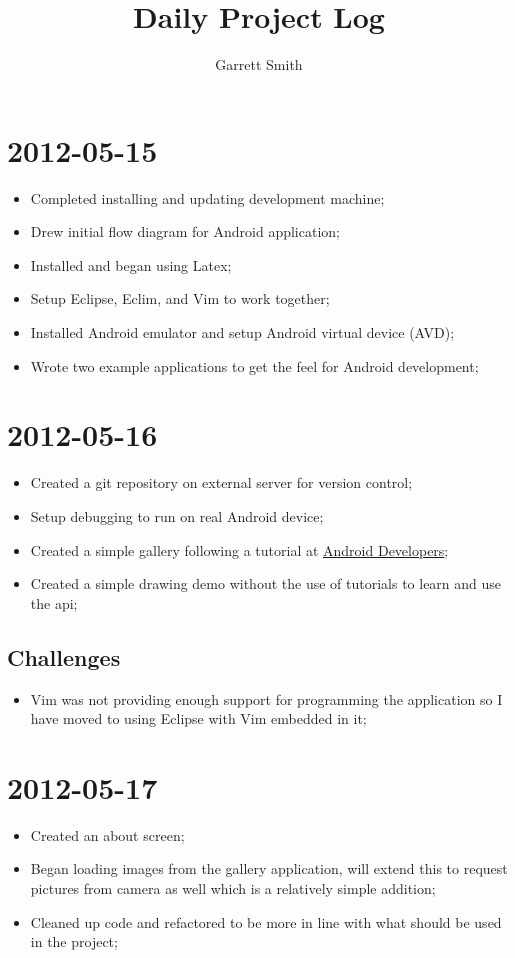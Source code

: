 \documentclass{report}
\title{Daily Project Log}
\author{Garrett Smith}
\begin{document}
\section*{2012-05-15}
\begin{itemize}
  \item
    Completed installing and updating development machine;
  \item
    Drew initial flow diagram for Android application;
  \item
    Installed and began using Latex;
  \item 
    Setup Eclipse, Eclim, and Vim to work together;
  \item
    Installed Android emulator and setup Android virtual device (AVD);
  \item
    Wrote two example applications to get the feel for Android development;
\end{itemize}

\section*{2012-05-16}
\begin{itemize}
  \item
    Created a git repository on external server for version control;
  \item
    Setup debugging to run on real Android device;
  \item
    Created a simple gallery following a tutorial at \href{http://developer.android.com/resources/tutorials/views/hello-gallery.html}{Android Developers};
  \item
    Created a simple drawing demo without the use of tutorials to learn and use the api;
\end{itemize}
\subsection*{Challenges}
\begin{itemize}
  \item
    Vim was not providing enough support for programming the application so I have moved to using Eclipse with Vim embedded in it;
\end{itemize}

\section*{2012-05-17}
\begin{itemize}
  \item
    Created an about screen;
  \item
    Began loading images from the gallery application, will extend this to request pictures from camera as well which is a relatively simple addition;
  \item
    Cleaned up code and refactored to be more in line with what should be used in the project;
\end{itemize}
\end{document}
